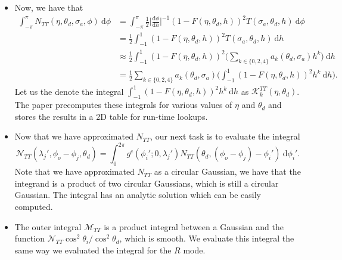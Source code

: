 \documentclass[10pt]{article}
\newcommand{\dee}{\mathrm{d}}
\newcommand{\modeint}{\mathcal{M}}
\newcommand{\azimint}{\mathcal{N}}
\begin{document}
\begin{itemize}
    \item Now, we have that
    \begin{align*}
      \int_{-\pi}^\pi N_{TT}(\eta, \theta_d, \sigma_a, \phi)\ \dee\phi 
      &=  \int_{-\pi}^\pi \frac{1}{2} \bigg| \frac{\dee\phi}{\dee h} \bigg|^{-1} (1 - F(\eta, \theta_d, h))^2 T(\sigma_a, \theta_d, h)\ \dee \phi\\
      &= \frac{1}{2} \int_{-1}^1 (1 - F(\eta, \theta_d, h))^2 T(\sigma_a, \theta_d, h)\ \dee h\\
      &\approx \frac{1}{2} \int_{-1}^1 (1 - F(\eta, \theta_d, h))^2 \bigg( \sum_{k \in \{ 0, 2, 4\}} a_k(\theta_d, \sigma_a) h^k \bigg) \ \dee h\\
      &= \frac{1}{2} \sum_{k \in \{ 0, 2, 4\}} a_k(\theta_d, \sigma_a)  \bigg(  \int_{-1}^1 (1 - F(\eta, \theta_d, h))^2 h^k  \ \dee h \bigg).
    \end{align*}
    Let us the denote the integral $\int_{-1}^1 (1 - F(\eta, \theta_d, h))^2 h^k  \ \dee h$
    as $\mathcal{K}^{TT}_k(\eta, \theta_d)$. The paper precomputes these integrals for various values of $\eta$ and $\theta_d$ and stores the results in a 2D table for run-time lookups.
    
    \item Now that we have approximated $N_{TT}$, our next task is to evaluate the integral $$\azimint_{TT}(\lambda_j', \phi_o - \phi_j, \theta_d) = \int_0^{2\pi} g^c(\phi_i'; 0, \lambda_j') N_{TT}(\theta_d, (\phi_o - \phi_j) - \phi_i')\ \dee \phi_i'.$$
    Note that we have approximated $N_{TT}$ as a circular Gaussian, we have that the integrand is a product of two circular Gaussians, which is still a circular Gaussian. The integral has an analytic solution which can be easily computed.
    
    \item The outer integral $\modeint_{TT}$ is a product integral between a Gaussian and the function $\azimint_{TT} \cos^2 \theta_i / \cos^2 \theta_d$, which is smooth. We evaluate this integral the same way we evaluated the integral for the $R$ mode.
  \end{itemize}
  
\end{document}
